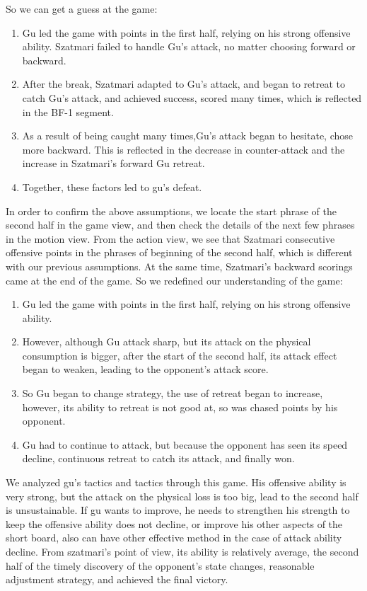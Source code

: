\documentclass[journal]{vgtc}                %
\begin{document}
So we can get a guess at the game:
\begin{enumerate}
	\item Gu led the game with points in the first half, relying on his strong offensive ability.
	Szatmari failed to handle Gu's attack, 	no matter choosing forward or backward.
	\item After the break, Szatmari adapted to Gu's attack, and began to retreat to catch Gu's attack, and achieved success, scored many times, which is reflected in the BF-1 segment.
	\item As a result of being caught many times,Gu's attack began to hesitate, chose more backward.
	This is reflected in the decrease in counter-attack and the increase in Szatmari's forward Gu retreat.
	\item Together, these factors led to gu's defeat.
\end{enumerate}
In order to confirm the above assumptions, we locate the start phrase of the second half in the game view, and then check the details of the next few phrases in the motion view.
From the action view, we see that Szatmari consecutive offensive points in the phrases of beginning of the second half, which is different with our previous assumptions.
At the same time, Szatmari's backward scorings came at the end of the game.
So we redefined our understanding of the game:
\begin{enumerate}
	\item Gu led the game with points in the first half, relying on his strong offensive ability.
	\item However, although Gu attack sharp, but its attack on the physical consumption is bigger, after the start of the second half, its attack effect began to weaken, leading to the opponent's attack score.
	\item So Gu began to change strategy, the use of retreat began to increase, however, its ability to retreat is not good at, so was chased points by his opponent.
	\item Gu had to continue to attack, but because the opponent has seen its speed decline, continuous retreat to catch its attack, and finally won.
\end{enumerate}

We analyzed gu's tactics and tactics through this game.
His offensive ability is very strong, but the attack on the physical loss is too big, lead to the second half is unsustainable.
If gu wants to improve, he needs to strengthen his strength to keep the offensive ability does not decline, or improve his other aspects of the short board, also can have other effective method in the case of attack ability decline.
From szatmari's point of view, its ability is relatively average, the second half of the timely discovery of the opponent's state changes, reasonable adjustment strategy, and achieved the final victory.
\end{document}
